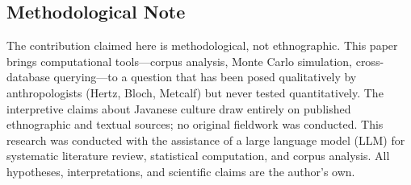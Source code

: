 \documentclass[12pt,a4paper]{article}
\begin{document}


\subsection*{Methodological Note}

The contribution claimed here is methodological, not ethnographic. This paper brings computational tools---corpus analysis, Monte Carlo simulation, cross-database querying---to a question that has been posed qualitatively by anthropologists (Hertz, Bloch, Metcalf) but never tested quantitatively. The interpretive claims about Javanese culture draw entirely on published ethnographic and textual sources; no original fieldwork was conducted. This research was conducted with the assistance of a large language model (LLM) for systematic literature review, statistical computation, and corpus analysis. All hypotheses, interpretations, and scientific claims are the author's own.
\end{document}
